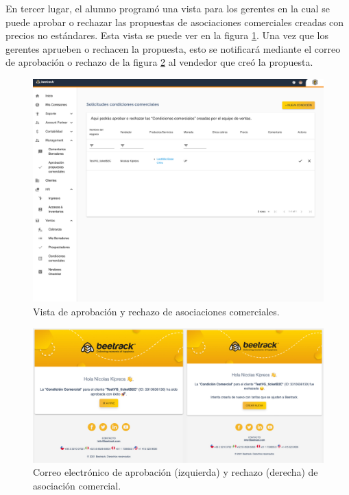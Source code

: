     En tercer lugar, el alumno programó una vista para los gerentes en la cual se puede aprobar o rechazar las propuestas de asociaciones comerciales creadas con precios no estándares. Esta vista se puede ver en la figura \ref{fig:cc_review}. Una vez que los gerentes aprueben o rechacen la propuesta, esto se notificará mediante el correo de aprobación o rechazo de la figura \ref{fig:cc_approve_reject} al vendedor que creó la propuesta.

    \begin{figure}[H]
      \centering
      \includegraphics[width=0.8\linewidth]{figures/cc/vistas/cc_review.png}
      \caption{Vista de aprobación y rechazo de asociaciones comerciales.}
      \label{fig:cc_review}
    \end{figure}

    \begin{figure}[H]
      \centering
      \includegraphics[width=\linewidth]{figures/cc/mails/cc_approve_reject.jpeg}
      \caption{Correo electrónico de aprobación (izquierda) y rechazo (derecha) de asociación comercial.}
      \label{fig:cc_approve_reject}
    \end{figure}

